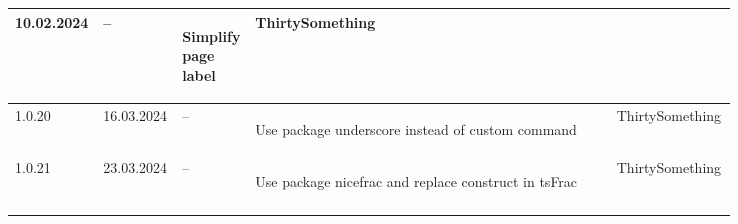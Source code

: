 \begin{tiny}
\begin{longtable}{ | p{0.06\linewidth} | p{0.08\linewidth} | p{0.06\linewidth} | P{0.49\linewidth} | p{0.15\linewidth} | }
        10.02.2024               &
        --                       &
        \begin{tsLTItemize}
            \item Simplify page label
        \end{tsLTItemize}
                                 &
        ThirtySomething            \\
        \hline
        1.0.20                   &
        16.03.2024               &
        --                       &
        \begin{tsLTItemize}
            \item Use package underscore instead of custom command
        \end{tsLTItemize}
                                 &
        ThirtySomething            \\
        \hline
        1.0.21                   &
        23.03.2024               &
        --                       &
        \begin{tsLTItemize}
            \item Use package nicefrac and replace construct in tsFrac
        \end{tsLTItemize}
                                 &
        ThirtySomething            \\
        \hline
    \end{longtable}
\end{tiny}
